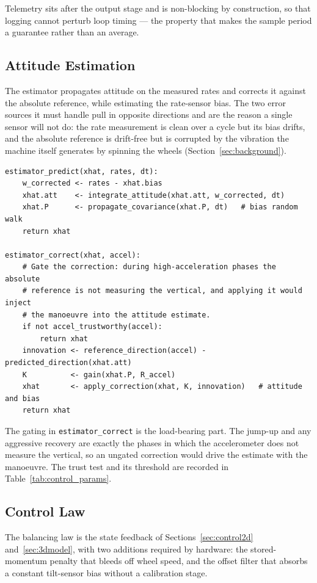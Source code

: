 Telemetry sits after the output stage and is non-blocking by construction, so
that logging cannot perturb loop timing --- the property that makes the sample
period a guarantee rather than an average.

\subsection{Attitude Estimation}
\label{app:estimator}

The estimator propagates attitude on the measured rates and corrects it against
the absolute reference, while estimating the rate-sensor bias. The two error
sources it must handle pull in opposite directions and are the reason a single
sensor will not do: the rate measurement is clean over a cycle but its bias
drifts, and the absolute reference is drift-free but is corrupted by the
vibration the machine itself generates by spinning the wheels
(Section~\ref{sec:background}).

\begin{verbatim}
estimator_predict(xhat, rates, dt):
    w_corrected <- rates - xhat.bias
    xhat.att    <- integrate_attitude(xhat.att, w_corrected, dt)
    xhat.P      <- propagate_covariance(xhat.P, dt)   # bias random walk
    return xhat

estimator_correct(xhat, accel):
    # Gate the correction: during high-acceleration phases the absolute
    # reference is not measuring the vertical, and applying it would inject
    # the manoeuvre into the attitude estimate.
    if not accel_trustworthy(accel):
        return xhat
    innovation <- reference_direction(accel) - predicted_direction(xhat.att)
    K          <- gain(xhat.P, R_accel)
    xhat       <- apply_correction(xhat, K, innovation)   # attitude and bias
    return xhat
\end{verbatim}

The gating in \texttt{estimator\_correct} is the load-bearing part. The jump-up
and any aggressive recovery are exactly the phases in which the accelerometer
does not measure the vertical, so an ungated correction would drive the estimate
with the manoeuvre. The trust test and its threshold are recorded in
Table~\ref{tab:control_params}.

\subsection{Control Law}
\label{app:control_law}

The balancing law is the state feedback of
Sections~\ref{sec:control2d} and~\ref{sec:3dmodel}, with two additions required
by hardware: the stored-momentum penalty that bleeds off wheel speed, and the
offset filter that absorbs a constant tilt-sensor bias without a calibration
stage.

